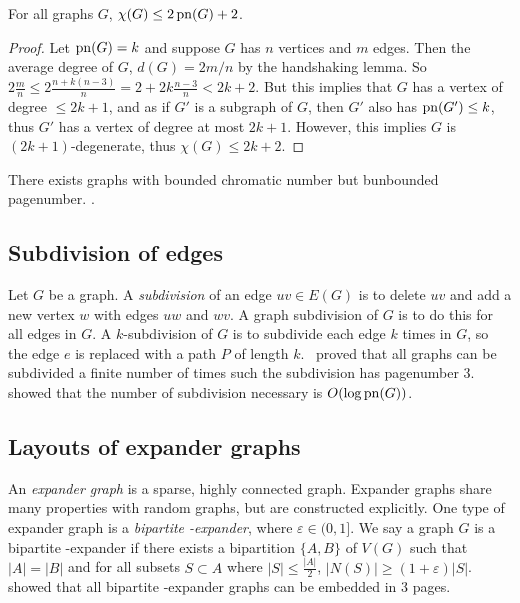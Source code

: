 \begin{theorem}\label{thm:Colouring_Bound}
	For all graphs \(G\), \(\chi(G) \leq 2 \operatorname{pn}(G) + 2\).
\end{theorem}
\begin{proof}
	Let \(\operatorname{pn}(G) = k\) and suppose \(G\) has \(n\) vertices and \(m\) edges. Then the average degree of \(G\), \(d(G) = 2m/n\) by the handshaking lemma. So \(2\frac{m}{n} \leq 2 \frac{n + k(n-3)}{n} = 2 + 2k \frac{n-3}{n} < 2k + 2\). But this implies that \(G\) has a vertex of degree \(\leq 2k + 1\), and as if \(G'\) is a subgraph of \(G\), then \(G'\) also has \(\operatorname{pn}(G') \leq k\), thus \(G'\) has a vertex of degree at most \(2k + 1\). However, this implies \(G\) is \((2k + 1)\)-degenerate, thus \(\chi(G) \leq 2k + 2\).
\end{proof}

There exists graphs with bounded chromatic number but bunbounded pagenumber. 
. 
\subsection{Subdivision of edges}
Let $G$ be a graph. A \textit{subdivision} of an edge $uv \in E(G)$ is to delete $uv$ and add a new vertex $w$ with edges $uw$ and $wv$. A graph subdivision of $G$ is to do this for all edges in $G$. A $k$-subdivision of $G$ is to subdivide each edge $k$ times in $G$, so the edge $e$ is replaced with a path $P$ of length $k$.\ \textcite{atneosenEmbeddabilityCompactaNbooks} proved that all graphs can be subdivided a finite number of times such the subdivision has pagenumber 3.\ \textcite{dujmovicLayoutsGraphSubdivisions2005} showed that the number of subdivision necessary is $O(\log\operatorname{pn}(G))$.

\subsection{Layouts of expander graphs}
An \textit{expander graph} is a sparse, highly connected graph. Expander graphs share many properties with random graphs, but are constructed explicitly. One type of expander graph is a \textit{bipartite \varepsilon-expander}, where $\varepsilon \in (0, 1]$. We say a graph $G$ is a bipartite \varepsilon-expander if there exists a bipartition $ \{A, B\}$ of $V(G)$ such that $|A| = |B|$ and for all subsets $S \subset A$ where $|S| \leq \frac{|A|}{2}$, $|N(S)| \geq (1 + \varepsilon) |S|$. 
\textcite{dujmovicLayoutsExpanderGraphs2016} showed that all bipartite \varepsilon-expander graphs can be embedded in 3 pages. 


